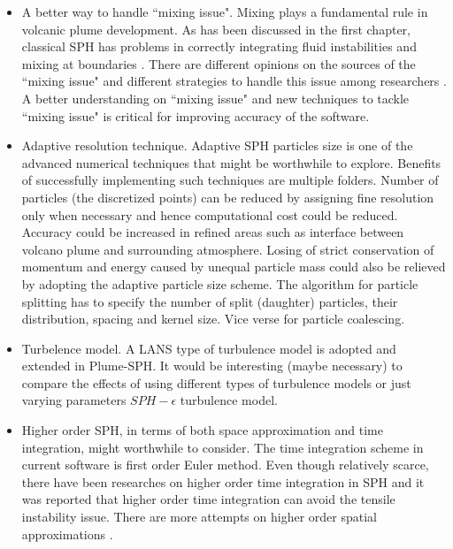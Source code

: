 \begin{itemize}
\item A better way to handle ``mixing issue". Mixing plays a fundamental rule in volcanic plume development. As has been discussed in the first chapter, classical SPH has problems in correctly integrating fluid instabilities and mixing at boundaries \citet{read2010resolving}. There are different opinions on the sources of the ``mixing issue" and different strategies to handle this issue among researchers \citep{chen1999improvement, ritchie2001multiphase, agertz2007fundamental, wadsley2008treatment, price2008modelling, read2010resolving, borgani2012hydrodynamic}. A better understanding on ``mixing issue" and new techniques to tackle ``mixing issue" is critical for improving accuracy of the software.
\item Adaptive resolution technique. Adaptive SPH particles size \citep{lopez2013dynamic, vacondio2016variable} is one of the advanced numerical techniques that might be worthwhile to explore. Benefits of successfully implementing such techniques are multiple folders. Number of particles (the discretized points) can be reduced by assigning fine resolution only when necessary and hence computational cost could be reduced. Accuracy could be increased in refined areas such as interface between volcano plume and surrounding atmosphere. Losing of strict conservation of momentum and energy caused by unequal particle mass could also be relieved by adopting the adaptive particle size scheme. The algorithm for particle splitting has to specify the number of split (daughter) particles, their distribution, spacing and kernel size. Vice verse for particle coalescing.
\item Turbelence model. A LANS type of turbulence model is adopted and extended in Plume-SPH. It would be interesting (maybe necessary) to compare the effects of using different types of turbulence models or just varying parameters $SPH-\epsilon$ turbulence model.
\item Higher order SPH, in terms of both space approximation and time integration, might worthwhile to consider. The time integration scheme in current software is first order Euler method. Even though relatively scarce, there have been researches \citep{blanc2012stabilized} on higher order time integration in SPH and it was reported that higher order time integration can avoid the tensile instability issue. There are more attempts on higher order spatial approximations \citep{bonet1999variational, dilts1999moving, leonardi2014explicit, lind2016high}.

\end{itemize}
